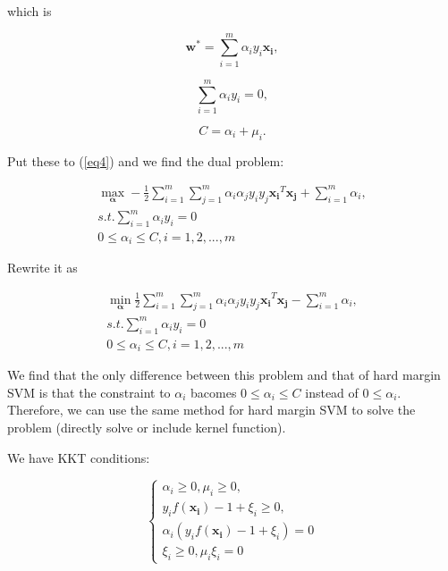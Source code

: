 \documentclass{article}
\begin{document}
which is

\begin{equation} \label{eq5}
\boldsymbol{w}^* = \sum_{i=1}^{m}{\alpha_i y_i \boldsymbol{x_i}},
\end{equation}

\begin{equation} \label{eq6}
\sum_{i=1}^{m}{\alpha_i y_i} = 0,
\end{equation}

\begin{equation} \label{eq7}
C = \alpha_i + \mu_i.
\end{equation}

Put these to (\ref{eq4}) and we find the dual problem:

\begin{gather*}
\max_{\boldsymbol{\alpha}} -\frac{1}{2}\sum_{i=1}^{m}{\sum_{j=1}^{m}{\alpha_i \alpha_j y_i y_j \boldsymbol{x_i}^T \boldsymbol{x_j}}} + \sum_{i=1}^{m}{\alpha_i},  \\
s.t. \sum_{i=1}^{m}{\alpha_i y_i} = 0 \\
0 \leq \alpha_i \leq C, i=1,2,...,m
\end{gather*}

Rewrite it as

\begin{gather*}
\min_{\boldsymbol{\alpha}} \frac{1}{2}\sum_{i=1}^{m}{\sum_{j=1}^{m}{\alpha_i \alpha_j y_i y_j \boldsymbol{x_i}^T \boldsymbol{x_j}}} - \sum_{i=1}^{m}{\alpha_i},  \\
s.t. \sum_{i=1}^{m}{\alpha_i y_i} = 0 \\
0 \leq \alpha_i \leq C, i=1,2,...,m
\end{gather*}

We find that the only difference between this problem and that of hard margin SVM is that the constraint to $\alpha_i$ bacomes $0 \leq \alpha_i \leq C$ instead of $0 \leq \alpha_i$. Therefore, we can use the same method for hard margin SVM to solve the problem (directly solve or include kernel function).

We have KKT conditions:

\begin{equation}
\begin{cases} \alpha_i \geq 0, \mu_i \geq 0, \\ y_i f(\boldsymbol{x_i}) - 1 + \xi_i \geq 0, \\ \alpha_i (y_i f(\boldsymbol{x_i}) -1 + \xi_i) = 0 \\ \xi_i \geq 0, \mu_i\xi_i = 0 \end{cases}
\end{equation}
\end{document}
